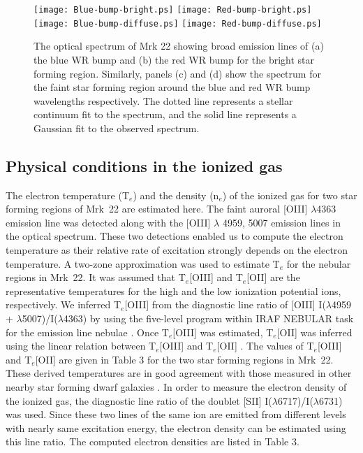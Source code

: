 \documentclass[useAMS,usenatbib]{mn2e}
\begin{document}
\begin{figure*}
\centering
\texttt{[image: Blue-bump-bright.ps]}
\texttt{[image: Red-bump-bright.ps]}
\texttt{[image: Blue-bump-diffuse.ps]}
\texttt{[image: Red-bump-diffuse.ps]}
\caption{The optical spectrum of Mrk 22 showing broad emission lines of (a) the blue WR bump and (b) the red WR bump for the bright star forming region. Similarly, panels (c) and (d) show the spectrum for the faint star forming region around the blue and red WR bump wavelengths respectively. The dotted line represents a stellar continuum fit to the spectrum, and the solid line represents a Gaussian fit to the observed spectrum.}
\label{fig:09}
\end{figure*} 

\subsection{Physical conditions in the ionized gas}\label{sec:3.2}

The electron temperature (T$_{e}$) and the density (n$_{e}$) of the ionized gas for two star forming regions of Mrk~22 are estimated here. The faint auroral [{\small{OIII}}] $\lambda$4363 emission line was detected along with the [O{\small{III}}] $\lambda$ 4959, 5007 emission lines in the optical spectrum. These two detections enabled us to compute the electron temperature as their relative rate of excitation strongly depends on the electron temperature. A two-zone approximation was used to estimate T$_{e}$ for the nebular regions in Mrk~22. It was assumed that T$_{e}$[O{\small{III}}] and T$_{e}$[O{\small{II}}] are the representative temperatures for the high and the low ionization potential ions, respectively. We inferred T$_{e}$[O{\small{III}}] from the diagnostic line ratio of [O{\small{III}}] I($\lambda$4959 + $\lambda$5007)/I($\lambda$4363) by using the five-level program within {\small IRAF NEBULAR} task for the emission line nebulae \citep{1995PASP..107..896S}. Once T$_{e}$[O{\small{III}}] was estimated, T$_{e}$[O{\small{II}}] was inferred using the linear relation between T$_{e}$[O{\small{III}}] and T$_{e}$[O{\small{II}}] \citep{1992AJ....103.1330G}. The values of T$_{e}$[O{\small{III}}] and T$_{e}$[O{\small{II}}] are given in Table 3 for the two star forming regions in Mrk~22. These derived temperatures are in good agreement with those measured in other nearby star forming dwarf galaxies \citep[e.g.,][]{1986MNRAS.223..811C,1994ApJ...420..576M,2004ApJ...616..752L,2008MNRAS.385..543H}. In order to measure the electron density of the ionized gas, the diagnostic line ratio of the doublet [S{\small{II}}] I($\lambda$6717)/I($\lambda$6731) was used. Since these two lines of the same ion are emitted from different levels with nearly same excitation energy, the electron density can be estimated using this line ratio. The computed electron densities are listed in Table 3.
\end{document}
